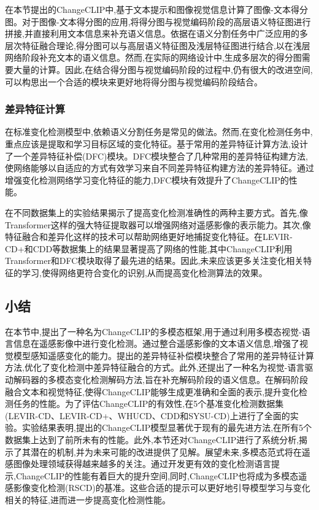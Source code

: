 在本节提出的ChangeCLIP中,基于文本提示和图像视觉信息计算了图像-文本得分图。对于图像-文本得分图的应用,将得分图与视觉编码阶段的高层语义特征图进行拼接,并直接利用文本信息来补充语义信息。依据在语义分割任务中广泛应用的多层次特征融合理论,得分图可以与高层语义特征图及浅层特征图进行结合,以在浅层网络阶段补充文本的语义信息。然而,在实际的网络设计中,生成多层次的得分图需要大量的计算。因此,在结合得分图与视觉编码阶段的过程中,仍有很大的改进空间,可以构思出一个合适的模块来更好地将得分图与视觉编码阶段结合。

\subsubsection{差异特征计算}

在标准变化检测模型中,依赖语义分割任务是常见的做法。然而,在变化检测任务中,重点应该是提取和学习目标区域的变化特征。基于常用的差异特征计算方法,设计了一个差异特征补偿(DFC)模块。DFC模块整合了几种常用的差异特征构建方法,使网络能够以自适应的方式有效学习来自不同差异特征构建方法的差异特征。通过增强变化检测网络学习变化特征的能力,DFC模块有效提升了ChangeCLIP的性能。

在不同数据集上的实验结果揭示了提高变化检测准确性的两种主要方式。首先,像Transformer这样的强大特征提取器可以增强网络对遥感影像的表示能力。其次,像特征融合和差异化这样的技术可以帮助网络更好地捕捉变化特征。在LEVIR-CD+和CDD等数据集上的结果显著提高了网络的性能,其中ChangeCLIP利用Transformer和DFC模块取得了最先进的结果。因此,未来应该更多关注变化相关特征的学习,使得网络更符合变化的识别,从而提高变化检测算法的效果。

\subsection{小结}

在本节中,提出了一种名为ChangeCLIP的多模态框架,用于通过利用多模态视觉-语言信息在遥感影像中进行变化检测。通过整合遥感影像的文本语义信息,增强了视觉模型感知遥感变化的能力。提出的差异特征补偿模块整合了常用的差异特征计算方法,优化了变化检测中差异特征融合的方式。此外,还提出了一种名为视觉-语言驱动解码器的多模态变化检测解码方法,旨在补充解码阶段的语义信息。在解码阶段融合文本和视觉特征,使得ChangeCLIP能够生成更准确和全面的表示,提升变化检测任务的性能。为了评估ChangeCLIP的有效性,在5个基准变化检测数据集(LEVIR-CD、LEVIR-CD+、WHUCD、CDD和SYSU-CD)上进行了全面的实验。实验结果表明,提出的ChangeCLIP模型显著优于现有的最先进方法,在所有5个数据集上达到了前所未有的性能。此外,本节还对ChangeCLIP进行了系统分析,揭示了其潜在的机制,并为未来可能的改进提供了见解。展望未来,多模态范式将在遥感图像处理领域获得越来越多的关注。通过开发更有效的变化检测语言提示,ChangeCLIP的性能有着巨大的提升空间,同时,ChangeCLIP也将成为多模态遥感影像变化检测(RSCD)的基准。这些合适的提示可以更好地引导模型学习与变化相关的特征,进而进一步提高变化检测性能。


